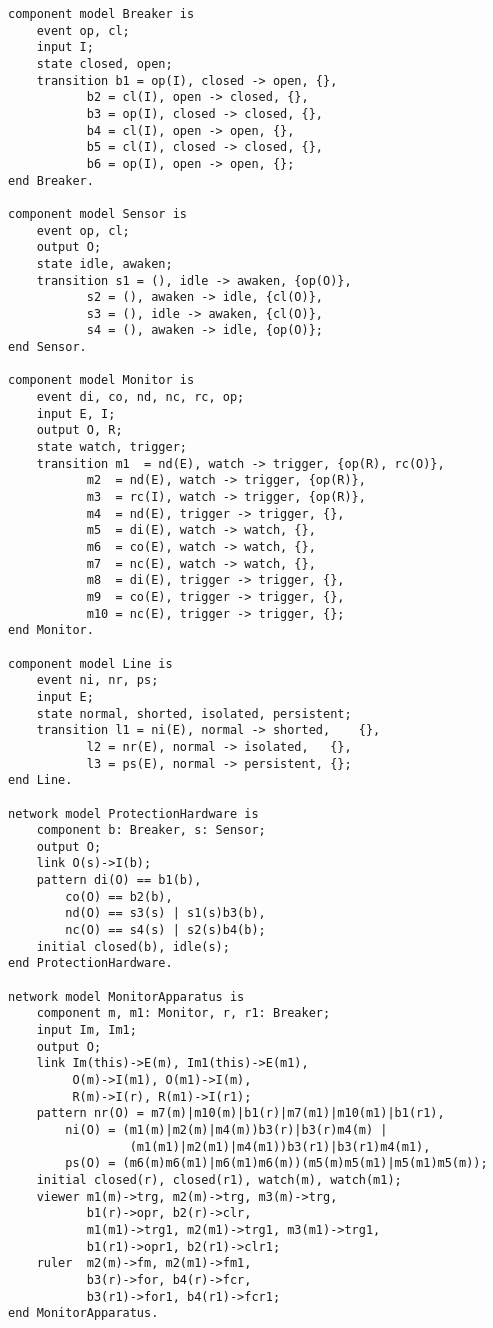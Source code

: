 \begin{verbatim}
component model Breaker is
	event op, cl;
	input I;
	state closed, open;
	transition b1 = op(I), closed -> open, {},
		   b2 = cl(I), open -> closed, {},
	 	   b3 = op(I), closed -> closed, {},
		   b4 = cl(I), open -> open, {},
		   b5 = cl(I), closed -> closed, {},
		   b6 = op(I), open -> open, {};
end Breaker.

component model Sensor is
	event op, cl;
	output O;
	state idle, awaken;
	transition s1 = (), idle -> awaken, {op(O)},
		   s2 = (), awaken -> idle, {cl(O)},
		   s3 = (), idle -> awaken, {cl(O)},
		   s4 = (), awaken -> idle, {op(O)};
end Sensor.

component model Monitor is
	event di, co, nd, nc, rc, op;
	input E, I;	
	output O, R;
	state watch, trigger;
	transition m1  = nd(E), watch -> trigger, {op(R), rc(O)},
		   m2  = nd(E), watch -> trigger, {op(R)},
		   m3  = rc(I), watch -> trigger, {op(R)},
		   m4  = nd(E), trigger -> trigger, {},
		   m5  = di(E), watch -> watch, {},
		   m6  = co(E), watch -> watch, {},
		   m7  = nc(E), watch -> watch, {},
		   m8  = di(E), trigger -> trigger, {},
		   m9  = co(E), trigger -> trigger, {},
		   m10 = nc(E), trigger -> trigger, {};
end Monitor.

component model Line is
	event ni, nr, ps;
	input E;
	state normal, shorted, isolated, persistent;
	transition l1 = ni(E), normal -> shorted,    {},
		   l2 = nr(E), normal -> isolated,   {},
		   l3 = ps(E), normal -> persistent, {};
end Line.

network model ProtectionHardware is
	component b: Breaker, s: Sensor;
	output O;
	link O(s)->I(b);
	pattern di(O) == b1(b),
		co(O) == b2(b),
		nd(O) == s3(s) | s1(s)b3(b),
		nc(O) == s4(s) | s2(s)b4(b);
	initial closed(b), idle(s);
end ProtectionHardware.

network model MonitorApparatus is
	component m, m1: Monitor, r, r1: Breaker;
	input Im, Im1;
	output O;
	link Im(this)->E(m), Im1(this)->E(m1),
	     O(m)->I(m1), O(m1)->I(m),
	     R(m)->I(r), R(m1)->I(r1);
	pattern nr(O) = m7(m)|m10(m)|b1(r)|m7(m1)|m10(m1)|b1(r1),
		ni(O) = (m1(m)|m2(m)|m4(m))b3(r)|b3(r)m4(m) |
				 (m1(m1)|m2(m1)|m4(m1))b3(r1)|b3(r1)m4(m1),
		ps(O) = (m6(m)m6(m1)|m6(m1)m6(m))(m5(m)m5(m1)|m5(m1)m5(m));
	initial closed(r), closed(r1), watch(m), watch(m1);
	viewer m1(m)->trg, m2(m)->trg, m3(m)->trg,
	       b1(r)->opr, b2(r)->clr, 
	       m1(m1)->trg1, m2(m1)->trg1, m3(m1)->trg1,
	       b1(r1)->opr1, b2(r1)->clr1;
	ruler  m2(m)->fm, m2(m1)->fm1, 
	       b3(r)->for, b4(r)->fcr,
	       b3(r1)->for1, b4(r1)->fcr1;
end MonitorApparatus.


\end{verbatim}
